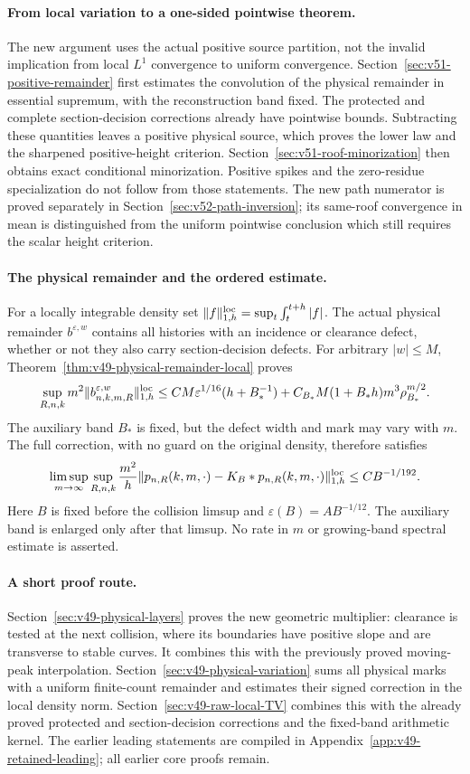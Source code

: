 \documentclass[11pt,reqno]{amsart}
\numberwithin{equation}{section}
\theoremstyle{definition}\newtheorem{definition}[theorem]{Definition}
\theoremstyle{remark}\newtheorem{remark}[theorem]{Remark}
\begin{document}
\paragraph{From local variation to a one-sided pointwise theorem.}
The new argument uses the actual positive source partition, not the
invalid implication from local $L^1$ convergence to uniform convergence.
Section~\ref{sec:v51-positive-remainder} first estimates the convolution
of the physical remainder in essential supremum, with the reconstruction
band fixed. The protected and complete section-decision corrections
already have pointwise bounds. Subtracting these quantities leaves a
positive physical source, which proves the lower law and the sharpened
positive-height criterion. Section~\ref{sec:v51-roof-minorization}
then obtains exact conditional minorization. Positive spikes and the zero-residue specialization do not follow
from those statements. The new path numerator is proved separately in
Section~\ref{sec:v52-path-inversion}; its same-roof convergence in mean
is distinguished from the uniform pointwise conclusion which still
requires the scalar height criterion.

\paragraph{The physical remainder and the ordered estimate.}
For a locally integrable density set
$\|f\|_{1,h}^{\rm loc}=\sup_t\int_t^{t+h}|f|$.
The actual physical remainder $b^{\varepsilon,w}$ contains all
histories with an incidence or clearance defect, whether or not they
also carry section-decision defects. For arbitrary $|w|\le M$,
Theorem~\ref{thm:v49-physical-remainder-local} proves
\[
 \sup_{R,n,k}m^2\|b^{\varepsilon,w}_{n,k,m,R}\|_{1,h}^{\rm loc}
 \le CM\varepsilon^{1/16}(h+B_*^{-1})
       +C_{B_*}M(1+B_*h)m^3\rho_{B_*}^{m/2}.
\]
The auxiliary band $B_*$ is fixed, but the defect width and mark may
vary with $m$. The full correction, with no guard on the original
density, therefore satisfies
\[
 \limsup_{m\to\infty}\sup_{R,n,k}
 \frac{m^2}{h}\|p_{n,R}(k,m,\cdot)-K_B*p_{n,R}(k,m,\cdot)\|_{1,h}^{\rm loc}
                         \le CB^{-1/192}.
\]
Here $B$ is fixed before the collision limsup and
$\varepsilon(B)=AB^{-1/12}$. The auxiliary band is enlarged only
after that limsup. No rate in $m$ or growing-band spectral estimate
is asserted.

\paragraph{A short proof route.}
Section~\ref{sec:v49-physical-layers} proves the new geometric
multiplier: clearance is tested at the next collision, where its
boundaries have positive slope and are transverse to stable curves.
It combines this with the previously proved moving-peak interpolation.
Section~\ref{sec:v49-physical-variation} sums all physical marks
with a uniform finite-count remainder and estimates their signed
correction in the local density norm.
Section~\ref{sec:v49-raw-local-TV} combines this with the already
proved protected and section-decision corrections and the fixed-band
arithmetic kernel. The earlier leading statements are compiled in
Appendix~\ref{app:v49-retained-leading}; all earlier core proofs remain.
\end{document}
